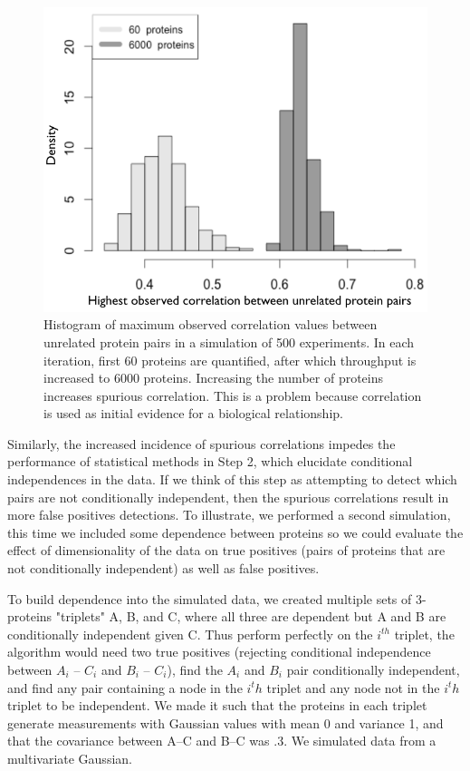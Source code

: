 \documentclass[journal=jacsat,manuscript=article]{achemso}
\def\added#1{{\color{blue} #1}}
\begin{document}
\begin{figure}[!tpb]
\centerline{\includegraphics[width=.8\textwidth]{figs/spurious_corr.png}}
\caption{Histogram of maximum observed correlation values between unrelated protein pairs in a simulation of 500 experiments.  In each iteration,  first 60 proteins are quantified, after which throughput is increased to 6000 proteins.  Increasing the number of proteins increases spurious correlation.  This is a problem because correlation is used as initial evidence for a biological relationship.}
\label{spur_corr}
\end{figure}

Similarly, the increased incidence of spurious correlations impedes the performance of statistical methods in Step 2, which elucidate conditional independences in the data.  If we think of this step as \added{attempting to detect which pairs are not conditionally independent}, then the spurious correlations result in more false positives \added{detections}. To illustrate, \added{we performed a second simulation}, this time we included some dependence between proteins so we could evaluate the effect of dimensionality of the data on true positives (pairs of proteins that are not conditionally independent) as well as false positives.  

\added{To build dependence into the simulated data, we created multiple sets of 3-proteins "triplets" A, B, and C, where all three are dependent but A and B are conditionally independent given C.  Thus perform perfectly on the $i^{th}$ triplet, the algorithm would need two true positives (rejecting conditional independence between $A_i$ -- $C_i$ and $B_i$ -- $C_i$), find the $A_i$ and $B_i$ pair conditionally independent, and find any pair containing a node in the $i^th$ triplet and any node not in the $i^th$ triplet to be independent.  We made it such that the proteins in each triplet generate measurements with Gaussian values with mean 0 and variance 1, and that the covariance between A--C and B--C was .3.  We simulated data from a multivariate Gaussian. }
\end{document}
